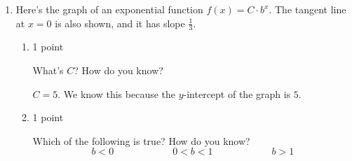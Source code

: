 \documentclass{article}
\begin{document}
\begin{enumerate}
\begin{enumerate}
    \begin{solution} 
       No. 
    \end{solution}

  \end{enumerate} 

\item  


  Here's the graph of an exponential function $f(x) = C \cdot b^x$. The tangent line at $x = 0$ is also shown, and it has slope $\frac{1}{3}$.
  \begin{center}
  \end{center}

  \begin{enumerate}
  \item

    \begin{grading}
      1 point
    \end{grading}

    \begin{problem}[0.25in]
      What's $C$? How do you know? 
    \end{problem}

    \begin{solution}
      $C=5$. We know this because the $y$-intercept
      of the graph is $5$.
    \end{solution}

  \item

    \begin{grading}
      1 point
    \end{grading}

    \begin{problem}[\stretch{0.5}]
      Which of the following is true? How do you know?
      \[ b < 0 \hspace{1in} 0 < b < 1 \hspace{1in} b > 1\]
    \end{problem}


\end{enumerate}
\end{enumerate}
\end{document}
